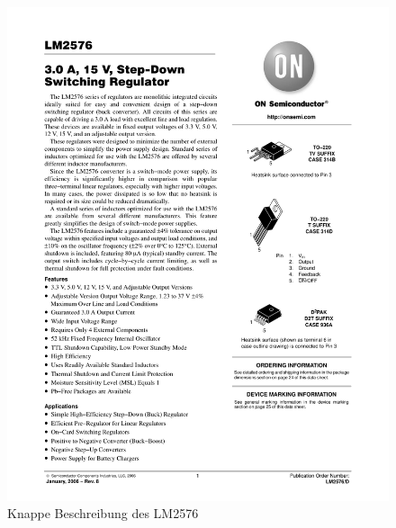 \begin{figure}[hb]
    \centering
    \includegraphics[scale=0.85,page=1]{fig/elektro/LM2576.pdf}
    \caption{Knappe Beschreibung des LM2576}
\end{figure}

